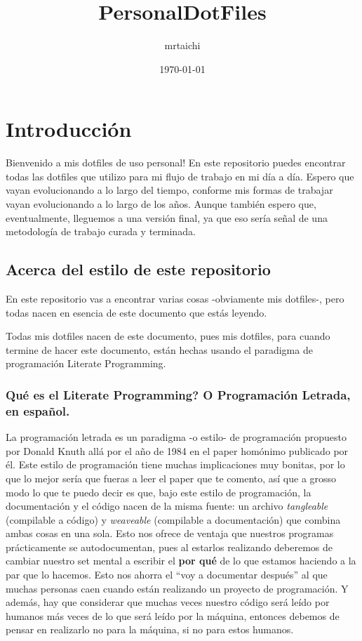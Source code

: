 \documentclass[11pt]{article}
\author{mrtaichi}
\date{\today}
\title{PersonalDotFiles}
\begin{document}
\maketitle
\tableofcontents

\section{Introducción}
\label{sec:org8027589}
Bienvenido a mis dotfiles de uso personal! En este repositorio puedes encontrar todas las dotfiles que utilizo para mi flujo de trabajo en mi día a día. Espero que vayan evolucionando a lo largo del tiempo, conforme mis formas de trabajar vayan evolucionando a lo largo de los años. Aunque también espero que, eventualmente, lleguemos a una versión final, ya que eso sería señal de una metodología de trabajo curada y terminada.
\subsection{Acerca del estilo de este repositorio}
\label{sec:orgd626734}
En este repositorio vas a encontrar varias cosas -obviamente mis dotfiles-, pero todas nacen en esencia de este documento que estás leyendo.

Todas mis dotfiles nacen de este documento, pues mis dotfiles, para cuando termine de hacer este documento, están hechas usando el paradigma de programación Literate Programming.
\subsubsection{Qué es el Literate Programming? O Programación Letrada, en español.}
\label{sec:org2281008}
La programación letrada es un paradigma -o estilo- de programación propuesto por Donald Knuth allá por el año de 1984 en el paper homónimo publicado por él. Este estilo de programación tiene muchas implicaciones muy bonitas, por lo que lo mejor sería que fueras a leer el paper que te comento, así que a grosso modo lo que te puedo decir es que, bajo este estilo de programación, la documentación y el código nacen de la misma fuente: un archivo \emph{tangleable} (compilable a código) y \emph{weaveable} (compilable a documentación) que combina ambas cosas en una sola.
Esto nos ofrece de ventaja que nuestros programas prácticamente se autodocumentan, pues al estarlos realizando deberemos de cambiar nuestro set mental a escribir el \textbf{por qué} de lo que estamos haciendo a la par que lo hacemos. Esto nos ahorra el ``voy a documentar después'' al que muchas personas caen cuando están realizando un proyecto de programación. Y además, hay que considerar que muchas veces nuestro código será leído por humanos más veces de lo que será leído por la máquina, entonces debemos de pensar en realizarlo no para la máquina, si no para estos humanos.
\end{document}

